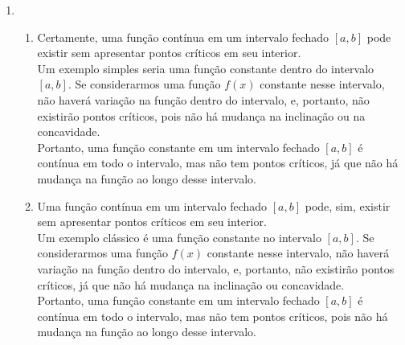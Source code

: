 \documentclass{article}
\begin{document}
\begin{enumerate}
\begin{enumerate}
	      \end{enumerate}

	\item \begin{enumerate}
		      \item Certamente, uma função contínua em um intervalo fechado
		            \([a, b]\) pode existir sem apresentar pontos críticos em seu
		            interior. \\

		            Um exemplo simples seria uma função constante dentro do
		            intervalo \([a, b]\). Se considerarmos uma função \(f(x)\)
		            constante nesse intervalo, não haverá variação na função
		            dentro do intervalo, e, portanto, não existirão pontos
		            críticos, pois não há mudança na inclinação ou na
		            concavidade. \\

		            Portanto, uma função constante em um intervalo fechado
		            \([a, b]\) é contínua em todo o intervalo, mas não tem
		            pontos críticos, já que não há mudança na função ao longo
		            desse intervalo. \\

		      \item
		            Uma função contínua em um intervalo fechado \([a, b]\)
		            pode, sim, existir sem apresentar pontos críticos em seu
		            interior. \\

		            Um exemplo clássico é uma função constante no intervalo
		            \([a, b]\). Se considerarmos uma função \(f(x)\) constante
		            nesse intervalo, não haverá variação na função dentro do
		            intervalo, e, portanto, não existirão pontos críticos, já
		            que não há mudança na inclinação ou concavidade. \\

		            Portanto, uma função constante em um intervalo fechado
		            \([a, b]\) é contínua em todo o intervalo, mas não tem
		            pontos críticos, pois não há mudança na função ao longo
		            desse intervalo. \\


\end{enumerate}
\end{enumerate}
\end{document}
